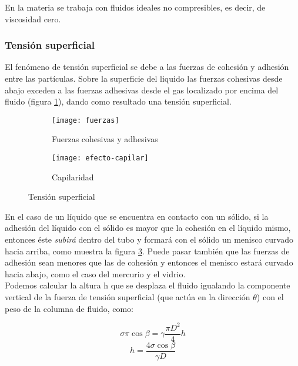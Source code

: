 En la materia \materia se trabaja con fluidos ideales no compresibles, es decir, de viscosidad cero.\\

\subsubsection{Tensión superficial}

El fenómeno de tensión superficial se debe a las fuerzas de cohesión y adhesión entre las partículas. Sobre la superficie del liquido las fuerzas cohesivas desde abajo exceden a las fuerzas adhesivas desde el gas localizado por encima del fluido (figura \ref{fuerzas_cohesivas_adhesivas}), dando como resultado una tensión superficial.

\begin{figure}[h]
	\centering
	\begin{subfigure}[b]{.45\linewidth}
		\centering
		\texttt{[image: fuerzas]}
		\caption{Fuerzas cohesivas y adhesivas}
		\label{fuerzas_cohesivas_adhesivas}
	\end{subfigure}
	\begin{subfigure}[b]{.45\linewidth}
		\centering
		\texttt{[image: efecto-capilar]}
		\caption{Capilaridad}
		\label{capilaridad}
	\end{subfigure}
	\caption{Tensión superficial}
\end{figure}

En el caso de un líquido que se encuentra en contacto con un sólido, si la adhesión del líquido con el sólido es mayor que la cohesión en el líquido mismo, entonces éste \emph{subirá} dentro del tubo y formará con el sólido un menisco curvado hacia arriba, como muestra la figura \ref{capilaridad}. Puede pasar también que las fuerzas de adhesión sean menores que las de cohesión y entonces el menisco estará curvado hacia abajo, como el caso del mercurio y el vidrio.\\ %

Podemos calcular la altura h que se desplaza el fluido igualando la componente vertical de la fuerza de tensión superficial (que actúa en la dirección $\theta$) con el peso de la columna de fluido, como:

\begin{equation*}
	\sigma \pi \cos \beta = \gamma \dfrac{\pi D^2}{4} h
\end{equation*}
\begin{equation}
	h = \dfrac{4 \sigma \cos \beta}{\gamma D}
\end{equation}

